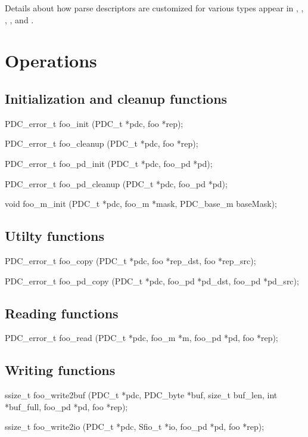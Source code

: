 Details about how parse descriptors are customized for various \PADS{}
types appear in
, ,
, , 
 and .

\section{Operations}
\label{common-operations}
\subsection{Initialization and cleanup functions}
\begin{code}
PDC_error_t foo_init (PDC_t *pdc, foo *rep);

PDC_error_t foo_cleanup (PDC_t *pdc, foo *rep);

PDC_error_t foo_pd_init (PDC_t *pdc, foo_pd *pd);

PDC_error_t foo_pd_cleanup (PDC_t *pdc, foo_pd *pd);

void foo_m_init (PDC_t *pdc, foo_m *mask, PDC_base_m baseMask);

\end{code}

\subsection{Utilty functions}
\begin{code}
PDC_error_t foo_copy (PDC_t *pdc, foo *rep_dst, foo *rep_src);

PDC_error_t foo_pd_copy (PDC_t *pdc, foo_pd *pd_dst, foo_pd *pd_src);
\end{code}

\subsection{Reading functions}
\begin{code}
PDC_error_t foo_read (PDC_t *pdc, foo_m *m, foo_pd *pd, foo *rep);
\end{code}

\subsection{Writing functions}
\begin{code}
ssize_t foo_write2buf (PDC_t *pdc, PDC_byte *buf, size_t buf_len, 
                       int *buf_full, foo_pd *pd, foo *rep);

ssize_t foo_write2io (PDC_t *pdc, Sfio_t *io, foo_pd *pd, foo *rep);

\end{code}

